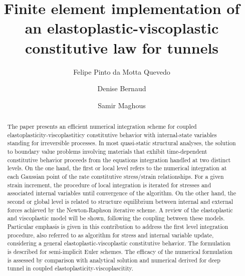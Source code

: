 \documentclass[Journal,letterpaper]{ascelike-new}
\begin{document}
\title{Finite element implementation of an elastoplastic-viscoplastic constitutive law for tunnels}

\author[1]{Felipe Pinto da Motta Quevedo}
\author[2]{Denise Bernaud}
\author[3]{Samir Maghous}


\maketitle

\begin{abstract}
The paper presents an efficient numerical integration scheme for coupled elastoplasticity-viscoplastiticy constitutive behavior with internal-state variables standing for irreversible processes. In most quasi-static structural analyses, the solution to boundary value problems involving materials that exhibit time-dependent constitutive behavior proceeds from the equations integration handled at two distinct levels. On the one hand, the first or local level refers to the numerical integration at each Gaussian point of the rate constitutive stress/strain relationships. For a given strain increment, the procedure of local integration is iterated for stresses and associated internal variables until convergence of the algorithm. On the other hand, the second or global level is related to structure equilibrium between internal and external forces achieved by the Newton-Raphson iterative scheme. A review of the elastoplastic and viscoplastic model will be shown, following the coupling between these models. Particular emphasis is given in this contribution to address the first level integration procedure, also referred to as algorithm for stress and internal variable update, considering a general elastoplastic-viscoplastic constitutive behavior. The formulation is described for semi-implicit Euler schemes. The efficacy of the numerical formulation is assessed by comparison with analytical solution and numerical derived for deep tunnel in coupled elastoplasticity-viscoplascitity.
\end{abstract}
\end{document}
